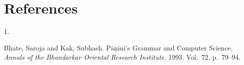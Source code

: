 \documentclass[
  a4paper,
]{article}
\newlength{\cslhangindent}
\newlength{\csllabelwidth}
\newlength{\cslentryspacingunit} %
\newenvironment{CSLReferences}[2] %
 {%
  \setlength{\parindent}{0pt}
  \ifodd #1
  \let\oldpar\par
  \def\par{\hangindent=\cslhangindent\oldpar}
  \fi
  \setlength{\parskip}{#2\cslentryspacingunit}
 }%
 {}
\newcommand{\CSLLeftMargin}[1]{\parbox[t]{\csllabelwidth}{#1}}
\newcommand{\CSLRightInline}[1]{\parbox[t]{\linewidth - \csllabelwidth}{#1}\break}
\begin{document}
\hypertarget{bibliography}{%
\section*{References}\label{bibliography}}

\hypertarget{refs}{}
\begin{CSLReferences}{0}{0}
\leavevmode{}%
\CSLLeftMargin{1. }%
\CSLRightInline{Bhate, Saroja and Kak, Subhash. {Pāṇini's Grammar and
Computer Science}. \emph{Annals of the Bhandarkar Oriental Research
Institute}. 1993. Vol.~72, p.~79--94. }

\end{CSLReferences}
\end{document}
